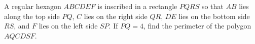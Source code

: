 A regular hexagon $ABCDEF$ is inscribed in a rectangle $PQRS$ so that $AB$ lies along the top side $PQ$, $C$ lies on the right side $QR$, $DE$ lies on the bottom side $RS$, and $F$ lies on the left side $SP$. If $PQ=4$, find the perimeter of the polygon $AQCDSF$.
